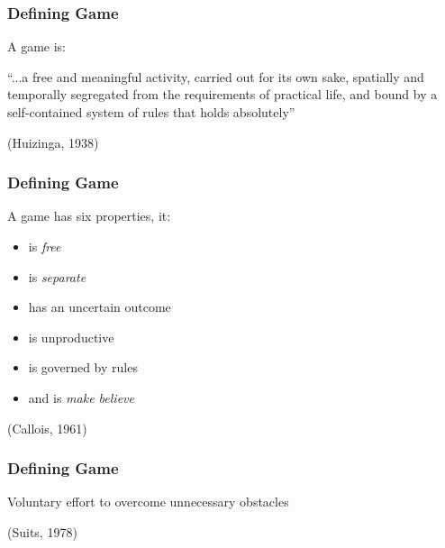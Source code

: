 \begin{frame}
	\frametitle{Defining Game}
	
	A game is:
		
	\begin{center}
	\begin{large}
	``...a free and meaningful activity, carried out for its own sake, spatially and temporally segregated from the requirements of practical life, and bound by a self-contained system of rules that holds absolutely''

	\end{large}
	
	\vspace{3em}
	
	(Huizinga, 1938)
	\end{center}
	
\end{frame}	

\begin{frame}
	\frametitle{Defining Game}
		
	A game has six properties, it:
	
	\begin{itemize}
		\item is \textit{free}
		\item is \textit{separate}
		\item has an uncertain outcome
		\item is unproductive
		\item is governed by rules
		\item and is \textit{make believe}
	\end{itemize}
	
	\vspace{3em}
	
	(Callois, 1961)

\end{frame}

\begin{frame}
	\frametitle{Defining Game}
		
	\begin{center}
	\begin{huge}
	Voluntary effort to overcome unnecessary obstacles
	\end{huge}
	
	\vspace{3em}
	
	(Suits, 1978)
	\end{center}

\end{frame}

